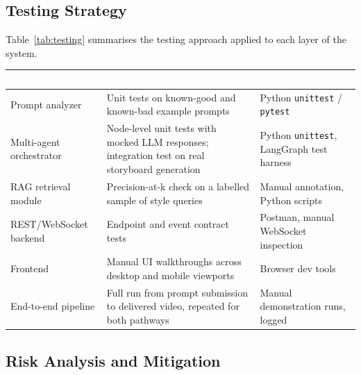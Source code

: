 \documentclass[11pt,a4paper]{article}
\newcommand{\tblhead}[1]{\cellcolor{headerblue}\textcolor{white}{\textbf{#1}}}
\begin{document}
\subsection{Testing Strategy}

Table~\ref{tab:testing} summarises the testing approach applied to each layer of the system.

\begin{center}
\begin{tabular}{|p{3.6cm}|p{4.4cm}|p{4.9cm}|}
\hline
\tblhead{Layer} & \tblhead{Testing Approach} & \tblhead{Tooling} \\
\hline
Prompt analyzer & Unit tests on known-good and known-bad example prompts & Python \texttt{unittest} / \texttt{pytest} \\
\hline
Multi-agent orchestrator & Node-level unit tests with mocked LLM responses; integration test on real storyboard generation & Python \texttt{unittest}, LangGraph test harness \\
\hline
RAG retrieval module & Precision-at-k check on a labelled sample of style queries & Manual annotation, Python scripts \\
\hline
REST/WebSocket backend & Endpoint and event contract tests & Postman, manual WebSocket inspection \\
\hline
Frontend & Manual UI walkthroughs across desktop and mobile viewports & Browser dev tools \\
\hline
End-to-end pipeline & Full run from prompt submission to delivered video, repeated for both pathways & Manual demonstration runs, logged \\
\hline
\end{tabular}
\label{tab:testing}
\end{center}

\subsection{Risk Analysis and Mitigation}
\end{document}

